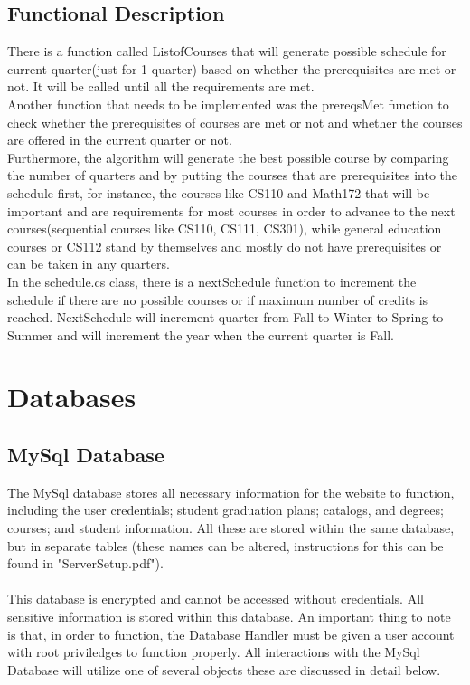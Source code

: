 \documentclass[letterpaper]{report}
\begin{document}
	\section{Functional Description}
	There is a function called ListofCourses that will generate possible schedule for current quarter(just for 1 quarter) based on whether the prerequisites are met or not. It will be called until all the requirements are met.\\
	Another function that needs to be implemented was the prereqsMet function to check whether the prerequisites of courses are met or not and whether the courses are offered in the current quarter or not.\\
	Furthermore, the algorithm will generate the best possible course by comparing the number of quarters and by putting the courses that are prerequisites into the schedule first, for instance, the courses like CS110 and Math172 that will be important and are requirements for most courses in order to advance to the next courses(sequential courses like CS110, CS111, CS301), while general education courses or CS112 stand by themselves and mostly do not have prerequisites or can be taken in any quarters.\\
	In the schedule.cs class, there is a nextSchedule function to increment the schedule if there are no possible courses or if maximum number of credits is reached. NextSchedule will increment quarter from Fall to Winter to Spring to Summer and will increment the year when the current quarter is Fall.
	\chapter{Databases}
	\section{MySql Database}
	The MySql database stores all necessary information for the website to function, including the user credentials; student graduation plans; catalogs, and degrees; courses; and student information. All these are stored within the same database, but in separate tables (these names can be altered, instructions for this can be found in "ServerSetup.pdf").\\ \\This database is encrypted and cannot be accessed without credentials. All sensitive information is stored within this database. An important thing to note is that, in order to function, the Database Handler must be given a user account with root priviledges to function properly.
	All interactions with the MySql Database will utilize one of several objects these are discussed in detail below.
\end{document}
